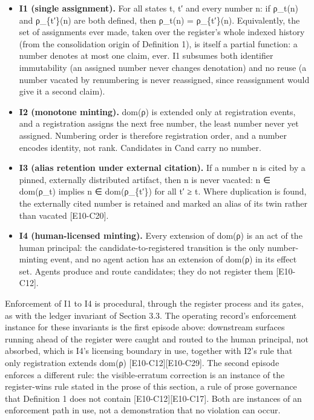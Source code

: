\documentclass[
  11pt,
]{article}
\begin{document}
\begin{itemize}
\item
  \textbf{I1 (single assignment).} For all states t, t′ and every number
  n: if ρ\_t(n) and ρ\_\{t′\}(n) are both defined, then ρ\_t(n) =
  ρ\_\{t′\}(n). Equivalently, the set of assignments ever made, taken
  over the register's whole indexed history (from the consolidation
  origin of Definition 1), is itself a partial function: a number
  denotes at most one claim, ever. I1 subsumes both identifier
  immutability (an assigned number never changes denotation) and no
  reuse (a number vacated by renumbering is never reassigned, since
  reassignment would give it a second claim).
\item
  \textbf{I2 (monotone minting).} dom(ρ) is extended only at
  registration events, and a registration assigns the next free number,
  the least number never yet assigned. Numbering order is therefore
  registration order, and a number encodes identity, not rank.
  Candidates in Cand carry no number.
\item
  \textbf{I3 (alias retention under external citation).} If a number n
  is cited by a pinned, externally distributed artifact, then n is never
  vacated: n ∈ dom(ρ\_t) implies n ∈ dom(ρ\_\{t′\}) for all t′ ≥ t.
  Where duplication is found, the externally cited number is retained
  and marked an alias of its twin rather than vacated {[}E10-C20{]}.
\item
  \textbf{I4 (human-licensed minting).} Every extension of dom(ρ) is an
  act of the human principal: the candidate-to-registered transition is
  the only number-minting event, and no agent action has an extension of
  dom(ρ) in its effect set. Agents produce and route candidates; they do
  not register them {[}E10-C12{]}.
\end{itemize}

Enforcement of I1 to I4 is procedural, through the register process and
its gates, as with the ledger invariant of Section 3.3. The operating
record's enforcement instance for these invariants is the first episode
above: downstream surfaces running ahead of the register were caught and
routed to the human principal, not absorbed, which is I4's licensing
boundary in use, together with I2's rule that only registration extends
dom(ρ) {[}E10-C12{]}{[}E10-C29{]}. The second episode enforces a
different rule: the visible-erratum correction is an instance of the
register-wins rule stated in the prose of this section, a rule of prose
governance that Definition 1 does not contain
{[}E10-C12{]}{[}E10-C17{]}. Both are instances of an enforcement path in
use, not a demonstration that no violation can occur.
\end{document}
